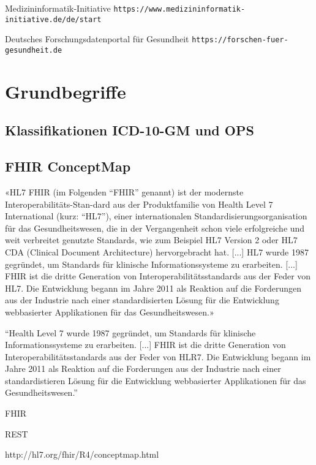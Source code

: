 Medizininformatik-Initiative
\texttt{https://www.medizininformatik-initiative.de/de/start}

Deutsches Forschungsdatenportal für Gesundheit
\texttt{https://forschen-fuer-gesundheit.de}

\section{Grundbegriffe}
\subsection{Klassifikationen ICD-10-GM und OPS}
\subsection{FHIR ConceptMap}

«HL7\textsuperscript{\textregistered} FHIR\textsuperscript{\textregistered} (im Folgenden "`FHIR"' genannt) ist der modernste Interoperabilitäts-Stan-\newline dard aus der Produktfamilie von Health Level 7 International (kurz: "`HL7"'), einer internationalen Standardisierungsorganisation für das Gesundheitswesen, die in der Vergangenheit schon viele erfolgreiche und weit verbreitet genutzte Standards, wie zum Beispiel HL7 Version 2 oder HL7 CDA (Clinical Document Architecture) hervorgebracht hat. [...] HL7 wurde 1987 gegründet, um Standards für klinische Informationssysteme zu erarbeiten. [...] FHIR ist die dritte Generation von Interoperabilitätsstandards aus der Feder von HL7. Die Entwicklung begann im Jahre 2011 als Reaktion auf die Forderungen aus der Industrie nach einer standardisierten Lösung für die Entwicklung webbasierter Applikationen für das Gesundheitswesen.» \cite{fhir-heckmann}

"`Health Level 7 wurde 1987 gegründet, um Standards für klinische Informationssysteme zu erarbeiten. [...] FHIR ist die dritte Generation von Interoperabilitätsstandards aus der Feder von HLR7. Die Entwicklung begann im Jahre 2011 als Reaktion auf die Forderungen aus der Industrie nach einer standardistieren Lösung für die Entwicklung webbasierter Applikationen für das Gesundheitswesen."' \cite[Seite 309]{fhir-heckmann}

FHIR \cite{braunstein2022health}


REST \cite{rest-fielding}


http://hl7.org/fhir/R4/conceptmap.html

